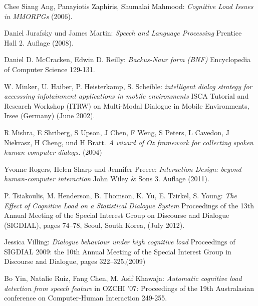 \documentclass[12pt,a4paper]{scrartcl}
\begin{document}
\begin{thebibliography}{Maron \& Ames, 1982}

	 Chee Siang Ang, Panayiotis Zaphiris, Shumalai Mahmood: \textit{Cognitive Load Issues in MMORPGs} 
(2006).

 Daniel Jurafsky und James Martin: \textit{Speech and Language Processing} Prentice Hall 2. Auflage (2008). 


	 Daniel D. McCracken,
Edwin D. Reilly: \textit{Backus-Naur form (BNF)} Encyclopedia of Computer Science 
129-131.


	 W. Minker, U. Haiber, P. Heisterkamp, S. 
Scheible: \textit{intelligent dialog strategy for accesssing infotainment applications in mobile 
environments} ISCA Tutorial and Research Workshop (ITRW) on Multi-Modal Dialogue in Mobile 
Environments, Irsee (Germany) (June 2002).

 R Mishra, E Shriberg, S Upson, J Chen, F Weng, S Peters,
L Cavedon, J Niekrasz, H Cheng, und H Bratt. \textit{A wizard of Oz framework for collecting spoken human-computer dialogs.} (2004)


 Yvonne Rogers, Helen Sharp und Jennifer Preece: \textit{Interaction Design: beyond human-computer interaction} John Wiley \& Sons 3. Auflage (2011). 

	 P. Tsiakoulis, M. Henderson, B. Thomson, K. Yu, E. Tzirkel, S. Young: \textit{The Effect of Cognitive Load on a Statistical Dialogue System} Proceedings of the 13th Annual Meeting of the Special Interest Group on Discourse and Dialogue (SIGDIAL), pages 74–78,
Seoul, South Korea, (July 2012).

 Jessica Villing: \textit{Dialogue behaviour under high cognitive load} Proceedings of SIGDIAL 2009: the 10th Annual Meeting of the Special Interest Group in Discourse and Dialogue, pages 322–325,(2009)



 Bo Yin, Natalie Ruiz, Fang Chen, M. Asif Khawaja: \textit{Automatic cognitive load detection from speech feature} in OZCHI ’07: Proceedings of the 19th Australasian conference on Computer-Human Interaction 249-255. 






\end{thebibliography}
\newpage
\end{document}
